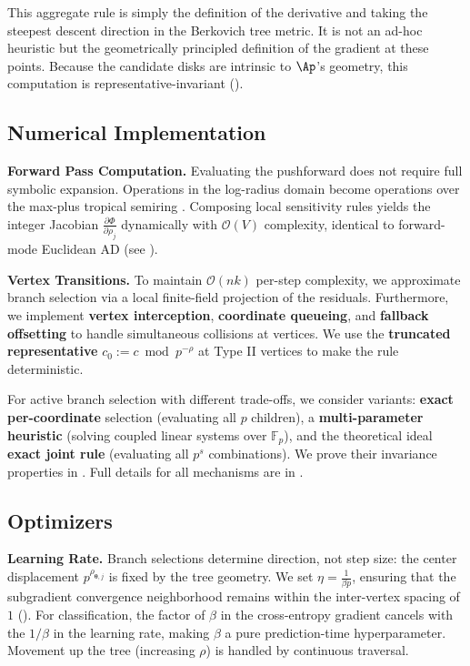 This aggregate rule is simply the definition of the derivative and taking the steepest descent direction in the Berkovich tree metric. It is not an ad-hoc heuristic but the geometrically principled definition of the gradient at these points. Because the candidate disks are intrinsic to $\Ap$'s geometry, this computation is representative-invariant ().

\subsection{Numerical Implementation}
\label{sec:numerical_integration}

\textbf{Forward Pass Computation.} Evaluating the pushforward does not require full symbolic expansion. Operations in the log-radius domain become operations over the max-plus tropical semiring \citep{maclagan2015introduction}. Composing local sensitivity rules yields the integer Jacobian $\frac{\partial \Phi}{\partial \rho_j}$ dynamically with $\mathcal{O}(V)$ complexity, identical to forward-mode Euclidean AD (see ).

\textbf{Vertex Transitions.} To maintain $\mathcal{O}(n k)$ per-step complexity, we approximate branch selection via a local finite-field projection of the residuals. Furthermore, we implement \textbf{vertex interception}, \textbf{coordinate queueing}, and \textbf{fallback offsetting} to handle simultaneous collisions at vertices. We use the \textbf{truncated representative} $c_0 := c \bmod p^{-\rho}$ at Type II vertices to make the rule deterministic. 

For active branch selection with different trade-offs, we consider variants: \textbf{exact per-coordinate} selection (evaluating all $p$ children), a \textbf{multi-parameter heuristic} (solving coupled linear systems over $\mathbb{F}_p$), and the theoretical ideal \textbf{exact joint rule} (evaluating all $p^s$ combinations). We prove their invariance properties in . Full details for all mechanisms are in .

\subsection{Optimizers}

\textbf{Learning Rate.} Branch selections determine direction, not step size: the center displacement $p^{\rho_{\boldsymbol{\theta}, j}}$ is fixed by the tree geometry. We set $\eta = \frac{1}{\beta p}$, ensuring that the subgradient convergence neighborhood remains within the inter-vertex spacing of $1$ (). For classification, the factor of $\beta$ in the cross-entropy gradient cancels with the $1/\beta$ in the learning rate, making $\beta$ a pure prediction-time hyperparameter. Movement up the tree (increasing $\rho$) is handled by continuous traversal.

